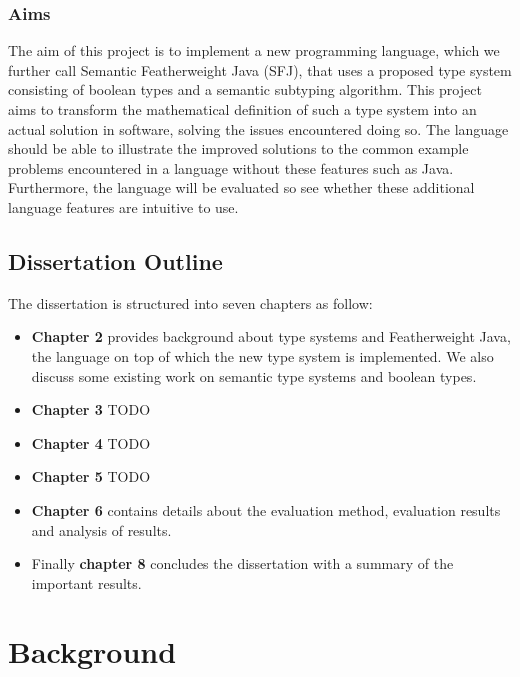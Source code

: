 \documentclass{l4proj}
\begin{document}
\subsection{Aims}

The aim of this project is to implement a new programming language, which we further call Semantic Featherweight Java (SFJ), that uses a proposed type system consisting of boolean types and a semantic subtyping algorithm.
This project aims to transform the mathematical definition of such a type system into an actual solution in software, solving the issues encountered doing so.
The language should be able to illustrate the improved solutions to the common example problems encountered in a language without these features such as Java.
Furthermore, the language will be evaluated so see whether these additional language features are intuitive to use.

\section{Dissertation Outline}

The dissertation is structured into seven chapters as follow:

\begin{itemize}
    \item
          \textbf{Chapter 2} provides background about type systems and Featherweight Java, the language on top of which the new type system is implemented.
          We also discuss some existing work on semantic type systems and boolean types.
    \item
          \textbf{Chapter 3} TODO
    \item
          \textbf{Chapter 4} TODO
    \item
          \textbf{Chapter 5} TODO
    \item
          \textbf{Chapter 6} contains details about the evaluation method, evaluation results and analysis of results.
    \item
          Finally \textbf{chapter 8} concludes the dissertation with a summary of the important results.
\end{itemize}


\chapter{Background}
\end{document}
